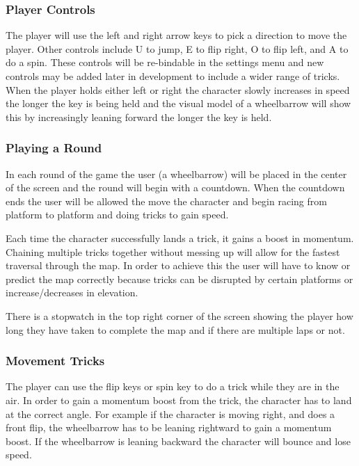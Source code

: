 \documentclass[12pt,]{article}
\begin{document}
\hypertarget{player-controls}{%
\subsubsection{Player Controls}\label{player-controls}}

The player will use the left and right arrow keys to pick a direction to
move the player. Other controls include U to jump, E to flip right, O to
flip left, and A to do a spin. These controls will be re-bindable in the
settings menu and new controls may be added later in development to
include a wider range of tricks. When the player holds either left or
right the character slowly increases in speed the longer the key is
being held and the visual model of a wheelbarrow will show this by
increasingly leaning forward the longer the key is held.

\hypertarget{playing-a-round}{%
\subsubsection{Playing a Round}\label{playing-a-round}}

In each round of the game the user (a wheelbarrow) will be placed in the
center of the screen and the round will begin with a countdown. When the
countdown ends the user will be allowed the move the character and begin
racing from platform to platform and doing tricks to gain speed.

Each time the character successfully lands a trick, it gains a boost in
momentum. Chaining multiple tricks together without messing up will
allow for the fastest traversal through the map. In order to achieve
this the user will have to know or predict the map correctly because
tricks can be disrupted by certain platforms or increase/decreases in
elevation.

There is a stopwatch in the top right corner of the screen showing the
player how long they have taken to complete the map and if there are
multiple laps or not.

\hypertarget{movement-tricks}{%
\subsubsection{Movement Tricks}\label{movement-tricks}}

The player can use the flip keys or spin key to do a trick while they
are in the air. In order to gain a momentum boost from the trick, the
character has to land at the correct angle. For example if the character
is moving right, and does a front flip, the wheelbarrow has to be
leaning rightward to gain a momentum boost. If the wheelbarrow is
leaning backward the character will bounce and lose speed.
\end{document}
